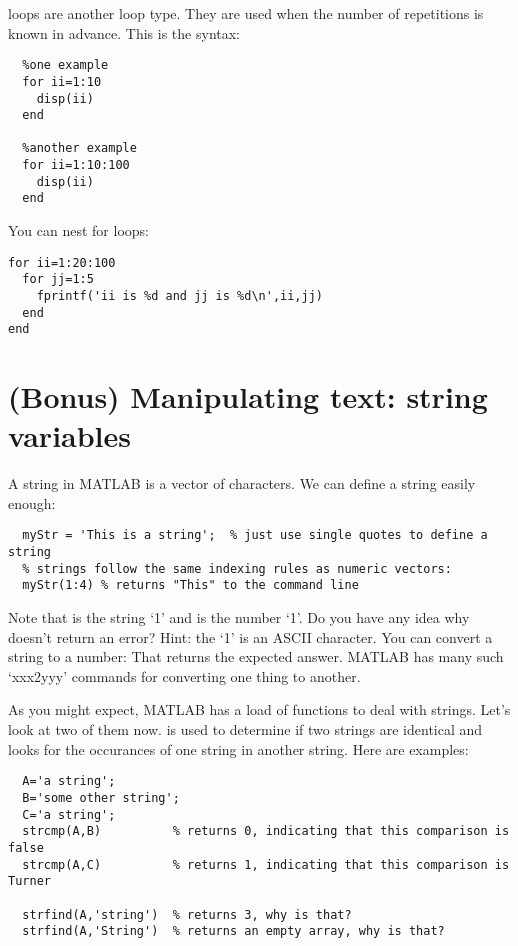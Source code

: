 \documentclass{article}
\begin{document}
 loops are another loop type. They are used when the number of repetitions is known in advance. This is the syntax:
\begin{lstlisting}
  %one example
  for ii=1:10
    disp(ii)
  end

  %another example
  for ii=1:10:100
    disp(ii)
  end
\end{lstlisting}

You can nest for loops:
\begin{lstlisting}
for ii=1:20:100
  for jj=1:5
    fprintf('ii is %d and jj is %d\n',ii,jj)
  end
end
\end{lstlisting}



\section{(Bonus) Manipulating text: string variables}

A string in MATLAB is a vector of characters. We can define a string easily enough:
\begin{lstlisting}
  myStr = 'This is a string';  % just use single quotes to define a string
  % strings follow the same indexing rules as numeric vectors:
  myStr(1:4) % returns "This" to the command line
\end{lstlisting}

Note that  is the string `1' and  is the number `1'.
Do you have any idea why  doesn't return an error?
Hint: the `1' is an ASCII character.
You can convert a string to a number:  That returns the expected answer.
MATLAB has many such `xxx2yyy' commands for converting one thing to another.

As you might expect, MATLAB has a load of functions to deal with strings.
Let's look at two of them now.
 is used to determine if two strings are identical and  looks for the occurances of one string in another string.
Here are examples:
\begin{lstlisting}
  A='a string';
  B='some other string';
  C='a string';
  strcmp(A,B)          % returns 0, indicating that this comparison is false
  strcmp(A,C)          % returns 1, indicating that this comparison is Turner

  strfind(A,'string')  % returns 3, why is that?
  strfind(A,'String')  % returns an empty array, why is that?
\end{lstlisting}
\end{document}
